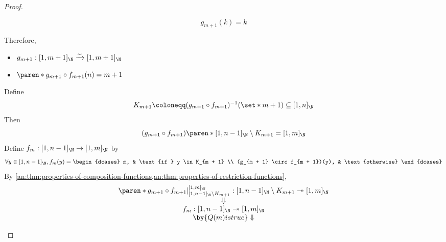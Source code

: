 \begin{proof}
\begin{enumerate}[label=\textbf{(\Alph*)}]
\begin{itemize}
\begin{itemize}
\begin{itemize}
\begin{itemize}
                                          \[
                                            g_{m + 1}(k) = k
                                          \]
                                  \end{itemize}
                          \end{itemize}
                          Therefore,
                          \begin{itemize}
                            \item $g_{m + 1}: [1, m + 1]_{\N} \xrightarrow{\sim} [1, m + 1]_{\N}$
                            \item $\paren*{g_{m + 1} \circ f_{m + 1}}(n) = m + 1$
                          \end{itemize}
                          Define
                          \[
                            K_{m + 1} \coloneqq (g_{m + 1} \circ f_{m + 1})^{-1}(\set*{m + 1}) \subseteq [1, n]_{\N}
                          \]
                          Then
                          \[
                            (g_{m + 1} \circ f_{m + 1})\paren*{[1, n - 1]_{\N} \setminus K_{m + 1}} = [1, m]_{\N}
                          \]
                          Define $f_{m}: [1, n - 1]_{\N} \to [1, m]_{\N}$ by
                          \[
                            \forall y \in [1, n - 1]_{\N}, f_{m}(y) = \begin{dcases}
                              m,                              & \text{if } y \in K_{m + 1} \\
                              (g_{m + 1} \circ f_{m + 1})(y), & \text{otherwise}
                            \end{dcases}
                          \]
                          By \cref{an:thm:properties-of-composition-functions,an:thm:properties-of-restriction-functions},
                          \[
                            \begin{array}{c}
                              \paren*{g_{m + 1} \circ f_{m + 1}}|_{[1, n - 1]_{\N} \setminus K_{m + 1}}^{[1, m]_{\N}}:
                              [1, n - 1]_{\N} \setminus K_{m + 1} \twoheadrightarrow [1, m]_{\N} \\
                              \Downarrow                                                         \\
                              f_{m}: [1, n - 1]_{\N} \twoheadrightarrow [1, m]_{\N}              \\
                              \by{\ensuremath{Q(m)} is true} \Downarrow                          \\

\end{array}\]
\end{itemize}
\end{itemize}
\end{enumerate}
\end{proof}
